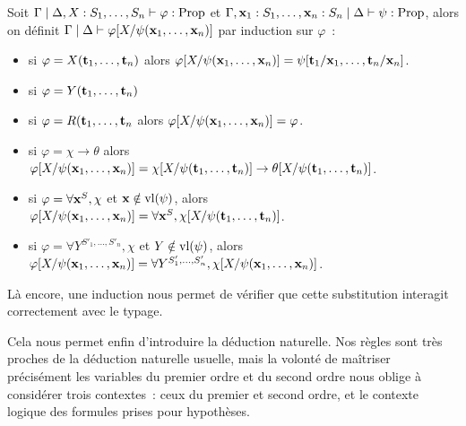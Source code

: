 \documentclass{article}
\begin{document}
\begin{defi}
    Soit $\Gamma\mid \Delta, X : S_1,\ldots,S_n\vdash \varphi : \mathrm{Prop}$ et $\Gamma, \mathbf{x}_1 : S_1,\ldots, \mathbf{x}_n : S_n\mid\Delta\vdash \psi : \mathrm{Prop}$, alors on définit $\Gamma\mid\Delta\vdash\varphi[X/\psi(\mathbf{x}_1,\ldots,\mathbf{x}_n)]$ par induction sur $\varphi$~:
    \begin{itemize}
        \item si $\varphi = X(\mathbf{t}_1,\ldots,\mathbf{t}_n)$ alors $\varphi[X/\psi(\mathbf{x}_1,\ldots,\mathbf{x}_n)] = \psi[\mathbf{t}_1/\mathbf{x}_1,\ldots,\mathbf{t}_n/\mathbf{x}_n]$.
        \item si $\varphi = Y(\mathbf{t}_1,\ldots,\mathbf{t}_n)$
        \item si $\varphi = R(\mathbf{t}_1,\ldots,\mathbf{t}_n$ alors $\varphi[X/\psi(\mathbf{x}_1,\ldots,\mathbf{x}_n)] = \varphi$.
        \item si $\varphi = \chi \to \theta$ alors $\varphi[X/\psi(\mathbf{x}_1,\ldots,\mathbf{x}_n)] = \chi[X/\psi(\mathbf{t}_1,\ldots,\mathbf{t}_n)] \to \theta[X/\psi(\mathbf{t}_1,\ldots,\mathbf{t}_n)]$.
        \item si $\varphi = \forall \mathbf{x}^S, \chi$ et $\mathbf{x} \notin \mathrm{vl}(\psi)$, alors $\varphi[X/\psi(\mathbf{x}_1,\ldots,\mathbf{x}_n)] = \forall \mathbf{x}^S, \chi[X/\psi(\mathbf{t}_1,\ldots,\mathbf{t}_n)]$.
        \item si $\varphi = \forall Y^{S'_1,\ldots,S'_n}, \chi$ et $Y\notin\mathrm{vl}(\psi)$, alors $\varphi[X/\psi(\mathbf{x}_1,\ldots,\mathbf{x}_n)] = \forall Y^{S'_1,\ldots,S'_n}, \chi[X/\psi(\mathbf{x}_1,\ldots,\mathbf{x}_n)]$.
    \end{itemize}
\end{defi}

Là encore, une induction nous permet de vérifier que cette substitution interagit correctement avec le typage.

Cela nous permet enfin d'introduire la déduction naturelle. Nos règles sont très proches de la déduction naturelle usuelle, mais la volonté de maîtriser précisément les variables du premier ordre et du second ordre nous oblige à considérer trois contextes~: ceux du premier et second ordre, et le contexte logique des formules prises pour hypothèses.
\end{document}
